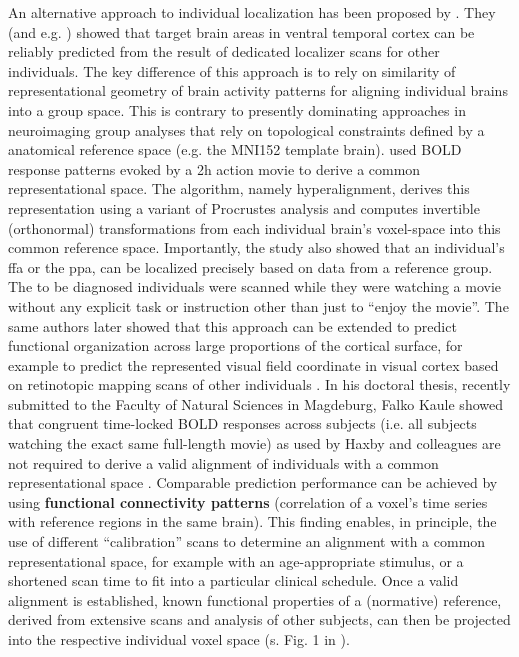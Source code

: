 %
An alternative approach to individual localization has been proposed by
\citet{haxby2011common}.
%
They (and e.g. \citet{jiahui2019predicting}) showed that target brain areas in
ventral temporal cortex can be reliably predicted from the result of dedicated
localizer scans for other individuals.
%
The key difference of this approach is to rely on similarity of representational
geometry of brain activity patterns for aligning individual brains into a group
space.
%
This is contrary to presently dominating approaches in neuroimaging group
analyses that rely on topological constraints defined by a anatomical reference
space (e.g. the MNI152 template brain).
%
\citet{haxby2011common} used BOLD response patterns evoked by a 2h action movie
to derive a common representational space.
%
The algorithm, namely hyperalignment, derives this representation using a
variant of Procrustes analysis and computes invertible (orthonormal)
transformations from each individual brain’s voxel-space into this common
reference space.
%
Importantly, the study also showed that an individual's \ac{ffa} or the
\ac{ppa}, can be localized precisely based on data from a reference group.
%
The to be diagnosed individuals were scanned while they were watching a movie
without any explicit task or instruction other than just to ``enjoy the movie''.
%
The same authors later showed that this approach can be extended to predict
functional organization across large proportions of the cortical surface, for
example to predict the represented visual field coordinate in visual cortex
based on retinotopic mapping scans of other individuals
\citep{guntupalli2016model}.
%
In his doctoral thesis, recently submitted to the Faculty of Natural Sciences in
Magdeburg, Falko Kaule showed that congruent time-locked BOLD responses across
subjects (i.e. all subjects watching the exact same full-length movie) as used
by Haxby and colleagues are not required to derive a valid alignment of
individuals with a common representational space \citep{kaule2017examination}.
%
Comparable prediction performance can be achieved by using \textbf{functional
connectivity patterns} (correlation of a voxel's time series with reference
regions in the same brain).
%
This finding enables, in principle, the use of different ``calibration'' scans
to determine an alignment with a common representational space, for example with
an age-appropriate stimulus, or a shortened scan time to fit into a particular
clinical schedule.
%
Once a valid alignment is established, known functional properties of a
(normative) reference, derived from extensive scans and analysis of other
subjects, can then be projected into the respective individual voxel space (s.
Fig. 1 in \citep{nishimoto2016lining}).

